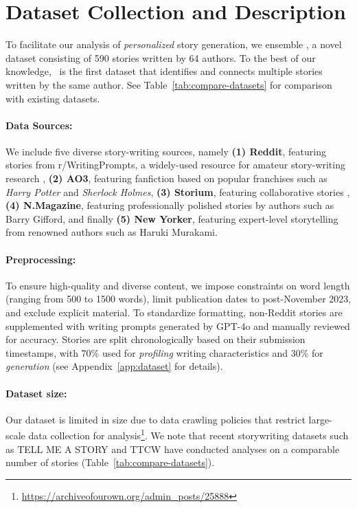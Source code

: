 \section{Dataset Collection and Description}

To facilitate our analysis of \emph{personalized} story generation, we ensemble \dataname, a novel dataset consisting of 590 stories written by 64 authors. To the best of our knowledge, \dataname~is the first dataset that identifies and connects multiple stories written by the same author. See Table~\ref{tab:compare-datasets} for comparison with existing datasets. 

\paragraph{Data Sources:} We include five diverse story-writing sources, namely
\textbf{(1) Reddit}, %
featuring stories from r/WritingPrompts, a widely-used resource for amateur story-writing research \citep{fan-etal-2018-hierarchical},   
\textbf{(2) AO3}, %
featuring fanfiction based on popular franchises such as \textit{Harry Potter} and \textit{Sherlock Holmes},   \textbf{(3) Storium}, %
featuring collaborative stories \citep{akoury-etal-2020-storium}, 
\textbf{(4) N.Magazine}, %
featuring professionally polished stories by authors such as Barry Gifford, and finally
\textbf{(5) New Yorker},  %
featuring expert-level storytelling from renowned authors such as Haruki Murakami.


\paragraph{Preprocessing:} To ensure high-quality and diverse content, we impose constraints on word length (ranging from 500 to 1500 words), limit publication dates to post-November 2023, and exclude explicit material. To standardize formatting, non-Reddit stories are supplemented with writing prompts generated by GPT-4o and manually reviewed for accuracy. Stories are split chronologically based on their submission timestamps, with 70\% used for \emph{profiling} writing characteristics and 30\% for \emph{generation} (see  Appendix~\ref{app:dataset} for details).

\paragraph{Dataset size:} Our dataset is limited  in size due to data crawling policies that restrict large-scale data collection for analysis\footnote{\url{https://archiveofourown.org/admin_posts/25888}}. We note that recent storywriting datasets such as TELL ME A STORY \citep{huot2024agents} and TTCW \citep{chakrabarty2024art} have conducted analyses on a comparable number of stories (Table~\ref{tab:compare-datasets}).



